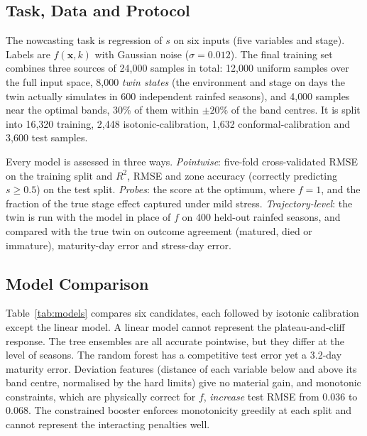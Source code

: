 \documentclass[conference]{IEEEtran}
\begin{document}
\subsection{Task, Data and Protocol}
The nowcasting task is regression of $s$ on six inputs (five variables and stage). Labels are
$f(\mathbf{x},k)$ with Gaussian noise ($\sigma = 0.012$). The final training set combines three
sources of 24{,}000 samples in total: 12{,}000 uniform samples over the full input space,
8{,}000 \emph{twin states} (the environment and stage on days the twin actually simulates in 600
independent rainfed seasons), and 4{,}000 samples near the optimal bands, 30\% of them within
$\pm 20\%$ of the band centres. It is split into 16{,}320 training, 2{,}448 isotonic-calibration,
1{,}632 conformal-calibration and 3{,}600 test samples.

Every model is assessed in three ways. \emph{Pointwise}: five-fold cross-validated RMSE on the
training split and $R^2$, RMSE and zone accuracy (correctly predicting $s \ge 0.5$) on the test
split. \emph{Probes}: the score at the optimum, where $f = 1$, and the fraction of the true
stage effect captured under mild stress. \emph{Trajectory-level}: the twin is run with the model
in place of $f$ on 400 held-out rainfed seasons, and compared with the true twin on outcome
agreement (matured, died or immature), maturity-day error and stress-day error.

\subsection{Model Comparison}
Table~\ref{tab:models} compares six candidates, each followed by isotonic calibration except the
linear model. A linear model cannot represent the plateau-and-cliff response. The tree ensembles
are all accurate pointwise, but they differ at the level of seasons. The random forest has a
competitive test error yet a 3.2-day maturity error. Deviation features (distance of each
variable below and above its band centre, normalised by the hard limits) give no material gain,
and monotonic constraints, which are physically correct for $f$, \emph{increase} test RMSE
from 0.036 to 0.068. The constrained booster enforces monotonicity greedily at
each split and cannot represent the interacting penalties well.
\end{document}
